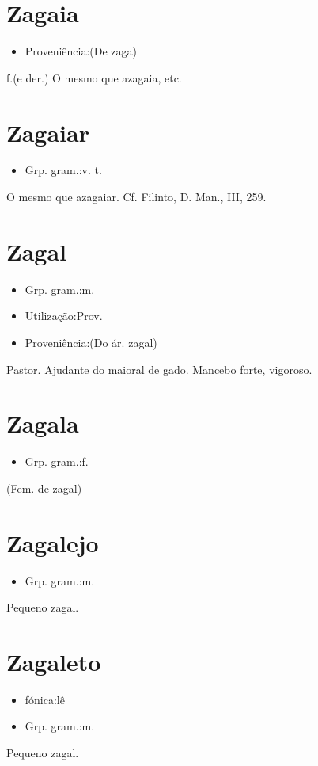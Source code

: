 \section{Zagaia}
\begin{itemize}
\item {Proveniência:(De \textunderscore zaga\textunderscore )}
\end{itemize}
\textunderscore f.\textunderscore  (e der.)
O mesmo que \textunderscore azagaia\textunderscore , etc.
\section{Zagaiar}
\begin{itemize}
\item {Grp. gram.:v. t.}
\end{itemize}
O mesmo que \textunderscore azagaiar\textunderscore . Cf. Filinto, \textunderscore D. Man.\textunderscore , III, 259.
\section{Zagal}
\begin{itemize}
\item {Grp. gram.:m.}
\end{itemize}
\begin{itemize}
\item {Utilização:Prov.}
\end{itemize}
\begin{itemize}
\item {Proveniência:(Do ár. \textunderscore zagal\textunderscore )}
\end{itemize}
Pastor.
Ajudante do maioral de gado.
Mancebo forte, vigoroso.
\section{Zagala}
\begin{itemize}
\item {Grp. gram.:f.}
\end{itemize}
(Fem. de \textunderscore zagal\textunderscore )
\section{Zagalejo}
\begin{itemize}
\item {Grp. gram.:m.}
\end{itemize}
Pequeno zagal.
\section{Zagaleto}
\begin{itemize}
\item {fónica:lê}
\end{itemize}
\begin{itemize}
\item {Grp. gram.:m.}
\end{itemize}
Pequeno zagal.
